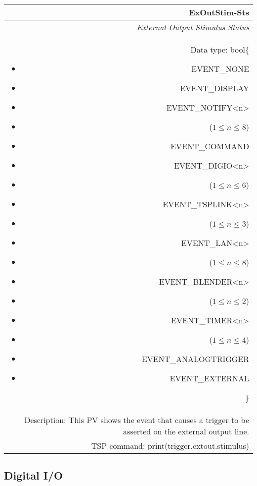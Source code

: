 \documentclass[openany]{article}
\begin{document}
		\begin{tabular}{N}
			\hline
			\bfseries ExOutStim-Sts\label{pv:exoutstim-sts} \\ \hline
			\emph{External Output Stimulus Status} \\
			Data type: bool\{\begin{itemize}[noitemsep]
				\small
				\item[] EVENT\_NONE
				\item[] EVENT\_DISPLAY
				\item[] EVENT\_NOTIFY\textless n\textgreater
				\item[] ($1\leq n\leq 8$)
				\item[] EVENT\_COMMAND
				\item[] EVENT\_DIGIO\textless n\textgreater
				\item[] ($1\leq n\leq 6$)
				\item[] EVENT\_TSPLINK\textless n\textgreater
				\item[] ($1\leq n\leq 3$)
				\item[] EVENT\_LAN\textless n\textgreater
				\item[] ($1\leq n\leq 8$)
				\item[] EVENT\_BLENDER\textless n\textgreater 
				\item[] ($1\leq n\leq 2$)
				\item[] EVENT\_TIMER\textless n\textgreater
				\item[] ($1\leq n\leq 4$)
				\item[] EVENT\_ANALOGTRIGGER
				\item[] EVENT\_EXTERNAL
			\end{itemize}\} \\
			Description: This PV shows the event that causes a trigger to be asserted on the external output line. \\
			TSP command: print(trigger.extout.stimulus)
		\end{tabular}

	\subsection{Digital I/O}\label{pvgroup:digital-io}

		\paragraph{} %
\end{document}
